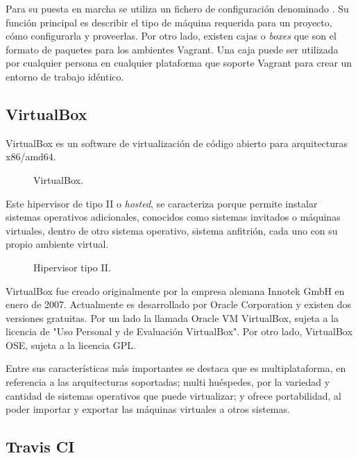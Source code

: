 Para su puesta en marcha se utiliza un fichero de configuración denominado . Su función principal es describir el tipo de máquina requerida para un proyecto, cómo configurarla y proveerlas. Por otro lado, existen cajas o \textit{boxes} que son el formato de paquetes para los ambientes Vagrant. Una caja puede ser utilizada por cualquier persona en cualquier plataforma que soporte Vagrant para crear un entorno de trabajo idéntico.

\subsection{VirtualBox}

VirtualBox es un software de virtualización de código abierto para arquitecturas x86/amd64. 

\begin{figure}[H]
\caption{VirtualBox.\label{fig:figure_placement_example}}
\end{figure}

Este hipervisor de tipo II o \textit{hosted}, se caracteriza porque permite instalar sistemas operativos adicionales, conocidos como sistemas invitados o máquinas virtuales, dentro de otro sistema operativo, sistema anfitrión, cada uno con su propio ambiente virtual.

\begin{figure}[H]
\caption{Hipervisor tipo II.\label{fig:figure_placement_example}}
\end{figure}

VirtualBox fue creado originalmente por la empresa alemana Innotek GmbH en enero de 2007. Actualmente es desarrollado por Oracle Corporation y existen dos versiones gratuitas. Por un lado la llamada Oracle VM VirtualBox, sujeta a la licencia de "Uso Personal y de Evaluación VirtualBox". Por otro lado, VirtualBox OSE, sujeta a la licencia GPL.

Entre sus características más importantes se destaca que es multiplataforma, en referencia a las arquitecturas soportadas; multi huéspedes, por la variedad y cantidad de sistemas operativos que puede virtualizar; y ofrece portabilidad, al poder importar y exportar las máquinas virtuales a otros sistemas.

\subsection{Travis CI}

